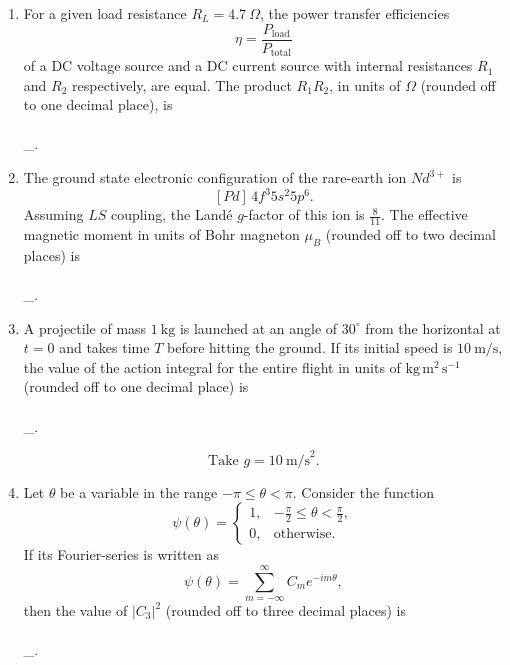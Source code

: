 \documentclass[journal,12pt,onecolumn]{IEEEtran}
\begin{document}
\begin{enumerate}[itemsep=0.45cm]
    \item For a given load resistance $R_{L}=4.7~\Omega$, the power transfer efficiencies 
    \[
    \eta = \frac{P_{\text{load}}}{P_{\text{total}}}
    \]
    of a DC voltage source and a DC current source with internal resistances $R_{1}$ and $R_{2}$ respectively, are equal. The product $R_{1}R_{2}$, in units of $\Omega$ (rounded off to one decimal place), is \\\\\_.

    \hfill{}

    \item The ground state electronic configuration of the rare-earth ion $Nd^{3+}$ is 
    \[
    [Pd]\,4f^{3}5s^{2}5p^{6}.
    \]
    Assuming $LS$ coupling, the Landé $g$-factor of this ion is $\tfrac{8}{11}$. The effective magnetic moment in units of Bohr magneton $\mu_{B}$ (rounded off to two decimal places) is \\\\\_.

    \hfill{}

    \item A projectile of mass $1~\text{kg}$ is launched at an angle of $30^{\circ}$ from the horizontal at $t=0$ and takes time $T$ before hitting the ground. If its initial speed is $10~\text{m/s}$, the value of the action integral for the entire flight in units of $\text{kg}\,\text{m}^{2}\,\text{s}^{-1}$ (rounded off to one decimal place) is \\\\\_. 

    \hfill{}
    \[
    \text{Take } g = 10~\text{m/s}^{2}.
    \]

    \item Let $\theta$ be a variable in the range $-\pi \leq \theta < \pi$. Consider the function
    \[
    \psi(\theta) = 
    \begin{cases}
        1, & -\tfrac{\pi}{2} \leq \theta < \tfrac{\pi}{2}, \\[6pt]
        0, & \text{otherwise}.
    \end{cases}
    \]
    If its Fourier-series is written as
    \[
    \psi(\theta) = \sum_{m=-\infty}^{\infty} C_{m} e^{-im\theta},
    \]
    then the value of $\lvert C_{3} \rvert^{2}$ (rounded off to three decimal places) is \\\\\_.

    \hfill{}


\end{enumerate}
\end{document}
